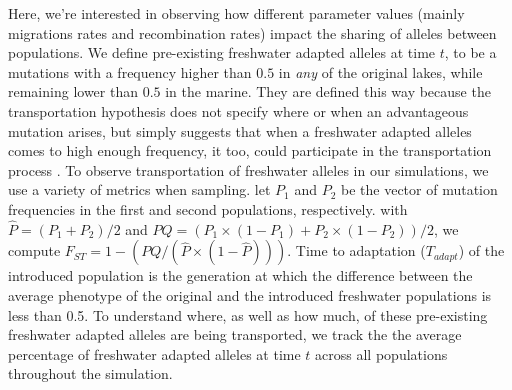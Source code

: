 \documentclass{article}
\newcommand{\plr}[1]{\todo[linecolor=blue,backgroundcolor=blue!25,bordercolor=blue]{#1}}
\begin{document}

Here, we're interested in observing how different parameter values
(mainly migrations rates and recombination rates)
impact the sharing of alleles between populations. 
We define pre-existing freshwater adapted alleles at time $t$,
to be a mutations with a frequency higher than $0.5$ in \textit{any} of the original lakes, 
while remaining lower than $0.5$ in the marine. 
They are defined this way because the transportation hypothesis does not specify where or when an advantageous mutation arises,
but simply suggests that when a freshwater adapted alleles comes to high enough frequency, it too, could participate in the transportation process \cite{schluter2009genetics}.
To observe transportation of freshwater alleles in our simulations, we use a variety of metrics when sampling.
let $P_{1}$ and $P_{2}$ be the vector of mutation frequencies in the first and second populations, respectively.
with $\hat{P} = (P_{1} + P_{2}) / 2$ and
$PQ = (P_{1} \times (1 - P_{1}) + P_{2} \times (1 - P_{2})) / 2$,
we compute $F_{ST} = 1 - (PQ / (\hat{P} \times (1 - \hat{P})))$.
Time to adaptation ($T_{adapt}$) of the introduced population is the generation at which
the difference between the average phenotype of the original and the introduced freshwater populations is less than 0.5. 
To understand where, as well as how much, of these pre-existing freshwater adapted alleles are being transported,
we track the the average percentage of freshwater adapted alleles at time $t$ across all populations throughout the simulation.
\end{document}
